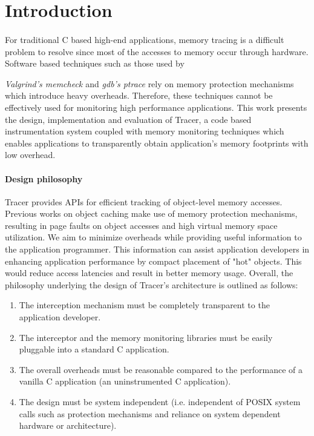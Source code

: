 \section{Introduction} 
\label{sec:intro}
\paragraph{}
For traditional C based high-end applications, memory tracing is a difficult problem to resolve since most of the accesses to memory occur through hardware. Software based techniques such as those used by {\emph{Valgrind's memcheck \cite{nethercote2007valgrind}} and {\emph{gdb's ptrace}} \cite{gdb} rely on memory protection mechanisms which introduce heavy overheads. Therefore, these techniques cannot be effectively used for monitoring high performance applications. This work presents the design, implementation and evaluation of Tracer, a code based instrumentation system coupled with memory monitoring techniques which enables applications to transparently obtain application's memory footprints with low overhead. 

\paragraph{Design philosophy}
Tracer provides APIs for efficient tracking of object-level memory accesses. Previous works on object caching make use of memory protection mechanisms, resulting in page faults on object accesses and high virtual memory space utilization. We aim to minimize overheads while providing useful information to the application programmer. This information can assist application developers in enhancing application performance by compact placement of "hot" objects. This would reduce access latencies and result in better memory usage. Overall, the philosophy underlying the design of Tracer's architecture is outlined as follows:
\begin{enumerate}
\item The interception mechanism must be completely transparent to the application developer.
\item The interceptor and the memory monitoring libraries must be easily pluggable into a standard C application.
\item The overall overheads must be reasonable compared to the performance of a vanilla C application (an uninstrumented C application).
\item The design must be system independent (i.e. independent of POSIX system calls such as protection mechanisms and reliance on system dependent hardware or architecture).
\end{enumerate}

}
